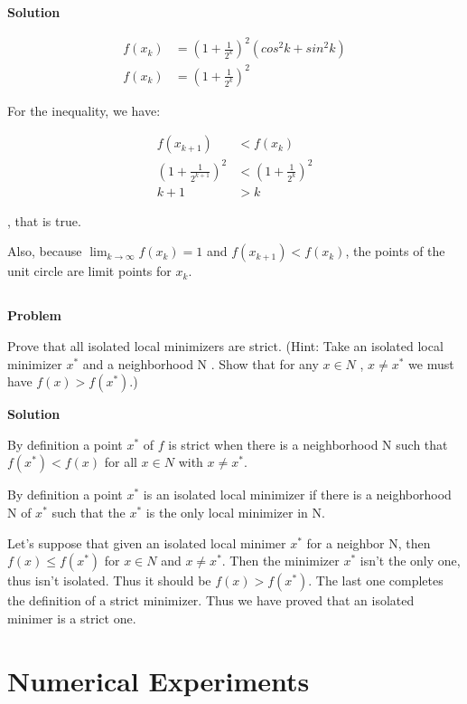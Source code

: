 \documentclass[a4paper,11pt]{article}
\numberwithin{equation}{section} %
\begin{document}
\textbf{Solution}

\begin{align}
    f(x_k) &= (1+\frac{1}{2^k})^2(cos^2k + sin^2k) \\
    f(x_k) &= (1+\frac{1}{2^k})^2
\end{align}

For the inequality, we have:

\begin{align}
    f(x_{k+1}) &< f(x_k) \\
    (1 + \frac{1}{2^{k+1}})^2 &< (1 + \frac{1}{2^k})^2 \\ 
    k+1 &> k
\end{align}

, that is true.

Also, because $\lim_{k\to\infty} f(x_k) = 1$ and $f(x_{k+1}) < f(x_k)$, the points of the unit circle are limit points for {$x_k$}.

\subsection{}

\textbf{Problem}

Prove that all isolated local minimizers are strict. (Hint: Take an isolated local
minimizer $x^{*}$ and a neighborhood N . Show that for any $x \in N$ , $x \neq x^{*}$ we must have $f(x) > f(x^{*})$.)

\textbf{Solution}

By definition a point $x^{*}$ of $f$ is strict when there is a neighborhood N such that $f(x^{*}) < f(x)$ for all $x \in N$ with $x \neq x^{*}$.

By definition a point $x^{*}$ is an isolated local minimizer if there is a neighborhood N of $x^{*}$ such that the $x^{*}$ is the only local minimizer in N.

Let's suppose that given an isolated local minimer $x^{*}$ for a neighbor N, then $f(x) \leq f(x^{*})$ for $x \in N$ and $x \neq x^{*}$. Then the minimizer $x^{*}$ isn't the only one, thus isn't isolated. Thus it should be $f(x) > f(x^{*})$. The last one completes the definition of a strict minimizer. Thus we have proved that an isolated minimer is a strict one.




\section{Numerical Experiments}
\end{document}
